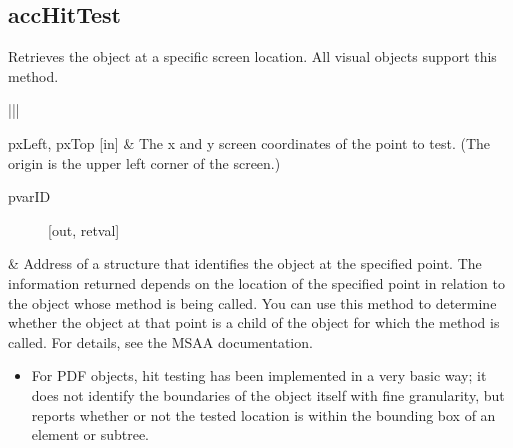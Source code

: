 \documentclass[letterpaper,12pt,english,openany,oneside]{sphinxmanual}
\begin{document}

\begin{sphinxVerbatim}[commandchars=\\\{\}]
\end{sphinxVerbatim}


\subsection{accHitTest}
\label{\detokenize{MSAA_PDF:acchittest}}
Retrieves the object at a specific screen location. All visual objects support this method.

\begin{sphinxVerbatim}[commandchars=\\\{\}]
    
\end{sphinxVerbatim}



\begin{savenotes}\sphinxattablestart
\centering
{}\label{\detokenize{MSAA_PDF:section-16}}\nobreak
\begin{tabular}[t]{|*{2}{|}}
\hline

pxLeft, pxTop
{[}in{]}
&
The x and y screen coordinates of the point to test. (The origin is the upper left corner of the screen.)
\\
\hline\begin{description}
\item[{pvarID}] \leavevmode
{[}out, retval{]}

\end{description}
&
Address of a  structure that identifies the object at the specified point. The information returned depends on the location of the specified point in relation to the object whose  method is being called. You can use this method to determine whether the object at that point is a child of the object for which the method is called. For details, see the MSAA documentation.
\begin{itemize}
\item {} 
For PDF objects, hit testing has been implemented in a very basic way; it does not identify the boundaries of the object itself with fine granularity, but reports whether or not the tested location is within the bounding box of an element or subtree.

\end{itemize}
\\
\hline
\end{tabular}
\par
\sphinxattableend\end{savenotes}
\end{document}
